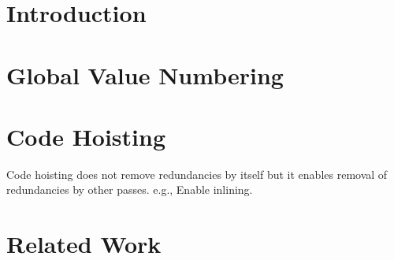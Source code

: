 \section{Introduction}

\section{Global Value Numbering}
\section{Code Hoisting}
Code hoisting does not remove redundancies by itself but it enables
removal of redundancies by other passes.  e.g., Enable inlining.
\section{Related Work}

